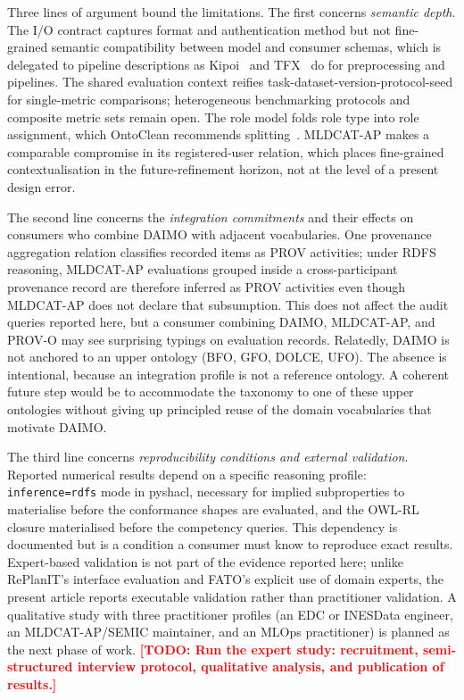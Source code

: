 \documentclass[Afour,sagev,times]{sagej}
\newcommand{\code}[1]{\texttt{#1}}
\newcommand{\TODO}[1]{\textcolor{red}{\textbf{[TODO: #1]}}}
\begin{document}
Three lines of argument bound the limitations. The first concerns \emph{semantic depth}. The I/O contract captures format and authentication method but not fine-grained semantic compatibility between model and consumer schemas, which is delegated to pipeline descriptions as Kipoi~\cite{kipoi} and TFX~\cite{tfx} do for preprocessing and pipelines. The shared evaluation context reifies task-dataset-version-protocol-seed for single-metric comparisons; heterogeneous benchmarking protocols and composite metric sets remain open. The role model folds role type into role assignment, which OntoClean recommends splitting~\cite{ontoclean}. MLDCAT-AP makes a comparable compromise in its registered-user relation, which places fine-grained contextualisation in the future-refinement horizon, not at the level of a present design error.

The second line concerns the \emph{integration commitments} and their effects on consumers who combine DAIMO with adjacent vocabularies. One provenance aggregation relation classifies recorded items as PROV activities; under RDFS reasoning, MLDCAT-AP evaluations grouped inside a cross-participant provenance record are therefore inferred as PROV activities even though MLDCAT-AP does not declare that subsumption. This does not affect the audit queries reported here, but a consumer combining DAIMO, MLDCAT-AP, and PROV-O may see surprising typings on evaluation records. Relatedly, DAIMO is not anchored to an upper ontology (BFO, GFO, DOLCE, UFO). The absence is intentional, because an integration profile is not a reference ontology. A coherent future step would be to accommodate the taxonomy to one of these upper ontologies without giving up principled reuse of the domain vocabularies that motivate DAIMO.

The third line concerns \emph{reproducibility conditions and external validation}. Reported numerical results depend on a specific reasoning profile: \code{inference=rdfs} mode in pyshacl, necessary for implied subproperties to materialise before the conformance shapes are evaluated, and the OWL-RL closure materialised before the competency queries. This dependency is documented but is a condition a consumer must know to reproduce exact results. Expert-based validation is not part of the evidence reported here; unlike RePlanIT's interface evaluation and FATO's explicit use of domain experts, the present article reports executable validation rather than practitioner validation. A qualitative study with three practitioner profiles (an EDC or INESData engineer, an MLDCAT-AP/SEMIC maintainer, and an MLOps practitioner) is planned as the next phase of work. \TODO{Run the expert study: recruitment, semi-structured interview protocol, qualitative analysis, and publication of results.}
\end{document}
